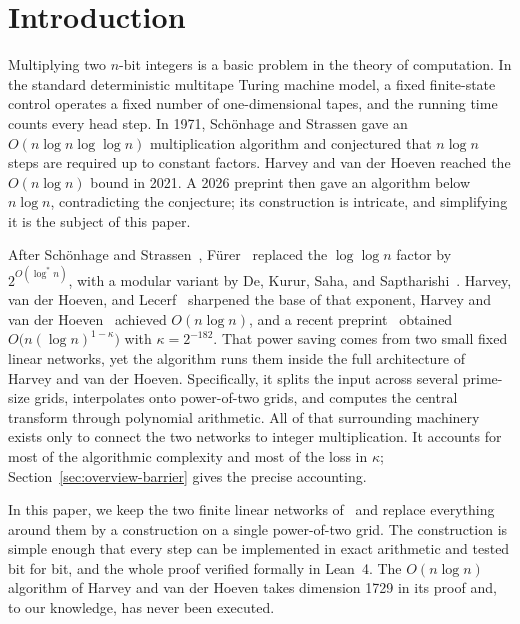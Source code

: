 \setlength{\textfloatsep}{12pt plus 2pt minus 2pt}
\setlength{\intextsep}{10pt plus 2pt minus 2pt}
\section{Introduction}\label{sec:intro}\label{sec:intro-background}

Multiplying two $n$-bit integers is a basic problem in the theory of computation. In the standard deterministic multitape Turing machine model, a fixed finite-state control operates a fixed number of one-dimensional tapes, and the running time counts every head step. In 1971, Sch\"onhage and Strassen gave an $O(n\log n\log\log n)$ multiplication algorithm and conjectured that $n\log n$ steps are required up to constant factors. Harvey and van der Hoeven reached the $O(n\log n)$ bound in 2021. A 2026 preprint then gave an algorithm below $n\log n$, contradicting the conjecture; its construction is intricate, and simplifying it is the subject of this paper.

After Sch\"onhage and Strassen~\cite{SS71}, F\"urer~\cite{Furer07,Furer09} replaced the $\log\log n$ factor by $2^{O(\log^* n)}$, with a modular variant by De, Kurur, Saha, and Saptharishi~\cite{DKSS13}. Harvey, van der Hoeven, and Lecerf~\cite{HvdHL16} sharpened the base of that exponent, Harvey and van der Hoeven~\cite{HvdH21} achieved $O(n\log n)$, and a recent preprint~\cite{OAI26} obtained $O\bigl(n(\log n)^{1-\kappa}\bigr)$ with $\kappa=2^{-182}$. That power saving comes from two small fixed linear networks, yet the algorithm runs them inside the full architecture of Harvey and van der Hoeven. Specifically, it splits the input across several prime-size grids, interpolates onto power-of-two grids, and computes the central transform through polynomial arithmetic. All of that surrounding machinery exists only to connect the two networks to integer multiplication. It accounts for most of the algorithmic complexity and most of the loss in $\kappa$; Section~\ref{sec:overview-barrier} gives the precise accounting.

In this paper, we keep the two finite linear networks of~\cite{OAI26} and replace everything around them by a construction on a single power-of-two grid. The construction is simple enough that every step can be implemented in exact arithmetic and tested bit for bit, and the whole proof verified formally in Lean~4. The $O(n\log n)$ algorithm of Harvey and van der Hoeven takes dimension 1729 in its proof and, to our knowledge, has never been executed.

